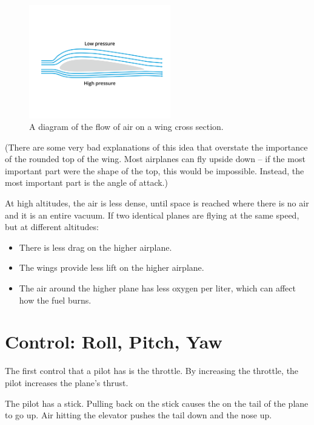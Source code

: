 \begin{figure}[H]
    \centering
    \includegraphics[width=0.55\textwidth]{airfoil.png}
    \caption{A diagram of the flow of air on a wing cross section.}
    \label{fig:airfoil}
\end{figure}



(There are some very bad explanations of this idea that overstate the importance of the rounded top of the wing.   Most airplanes can fly upside down -- if the
most important part were the shape of the top,  this would be impossible. Instead, the most important part is the angle of attack.)


At high altitudes, the air is less dense, until space is reached where there is no air and it is an entire vacuum. If two identical planes are flying  at the same speed,  but at different altitudes:
\begin{itemize}
\item There is less drag on the higher airplane.
\item The wings provide less lift on the higher airplane.
\item The air around the higher plane has less oxygen per liter, which can affect how the fuel burns.
\end{itemize}

\section{Control: Roll, Pitch, Yaw}
The first control that a pilot has is the throttle. By increasing the throttle, the pilot increases the plane's thrust.

The pilot has a stick.  Pulling back on the stick causes the  on the tail of the plane to go up.  Air hitting the elevator pushes the tail down and the nose up.

